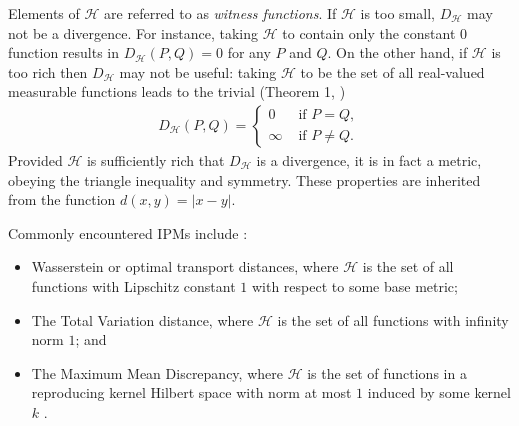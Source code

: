 Elements of $\mathcal{H}$ are referred to as \emph{witness functions}.
If $\mathcal{H}$ is too small, $D_\mathcal{H}$ may not be a divergence.
For instance, taking $\mathcal{H}$ to contain only the constant $0$ function results in $D_{\mathcal{H}}(P, Q) = 0$ for any $P$ and $Q$.
On the other hand, if $\mathcal{H}$ is too rich then $D_{\mathcal{H}}$ may not be useful: 
taking $\mathcal{H}$ to be the set of all real-valued measurable functions leads to the trivial (Theorem 1, \cite{sriperumbudur2009integral})
\begin{align*}
D_{\mathcal{H}}(P, Q) = \begin{cases} 0 &\text{ if } P = Q, \\ \infty &\text{ if } P \not= Q .\end{cases}
\end{align*}
%
Provided $\mathcal{H}$ is sufficiently rich that $D_{\mathcal{H}}$ is a divergence, it is in fact a metric, obeying the triangle inequality and symmetry.
These properties are inherited from the function $d(x,y) = |x - y|$.


Commonly encountered IPMs include \citep{sriperumbudur2009integral}:
\begin{itemize}	
\item Wasserstein or optimal transport distances, where $\mathcal{H}$ is the set of all functions with Lipschitz constant $1$ with respect to some base metric;
\item The Total Variation distance, where $\mathcal{H}$ is the set of all functions with infinity norm $1$; and
\item The Maximum Mean Discrepancy, where $\mathcal{H}$ is the set of functions in a reproducing kernel Hilbert space with norm at most $1$ induced by some kernel $k$ \citep{gretton2012kernel}.
\end{itemize}
 

